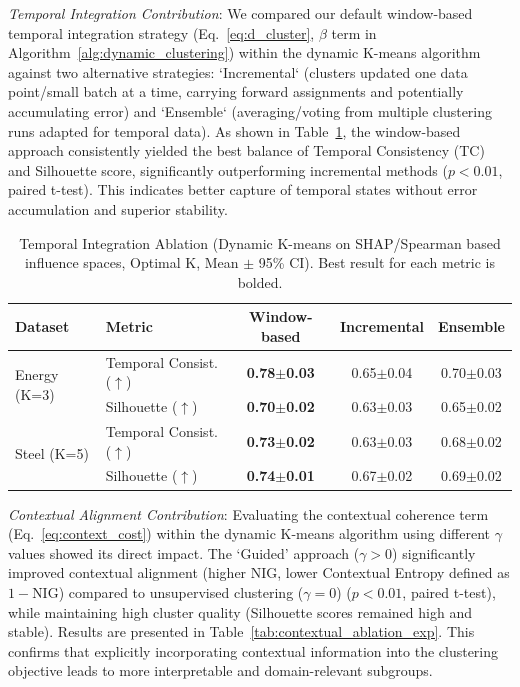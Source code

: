 \documentclass[final,authoryear,3p,times,review,sort&compress]{elsarticle}
\begin{document}
\textit{Temporal Integration Contribution}: We compared our default window-based temporal integration strategy (Eq.~\ref{eq:d_cluster}, $\beta$ term in Algorithm~\ref{alg:dynamic_clustering}) within the dynamic K-means algorithm against two alternative strategies: `Incremental` (clusters updated one data point/small batch at a time, carrying forward assignments and potentially accumulating error) and `Ensemble` (averaging/voting from multiple clustering runs adapted for temporal data). As shown in Table~\ref{tab:temporal_ablation_exp}, the window-based approach consistently yielded the best balance of Temporal Consistency (TC) and Silhouette score, significantly outperforming incremental methods ($p < 0.01$, paired t-test). This indicates better capture of temporal states without error accumulation and superior stability.

\begin{table}[t!]
\centering
\caption{Temporal Integration Ablation (Dynamic K-means on SHAP/Spearman based influence spaces, Optimal K, Mean $\pm$ 95\% CI). Best result for each metric is bolded.}
\label{tab:temporal_ablation_exp}
\begin{tabular}{@{}llccc@{}}
\toprule
\textbf{Dataset} & \textbf{Metric} & \textbf{Window-based} & \textbf{Incremental} & \textbf{Ensemble} \\ \midrule
\multirow{2}{*}{Energy (K=3)} & Temporal Consist. ($\uparrow$) & \textbf{0.78$\pm$0.03} & 0.65$\pm$0.04 & 0.70$\pm$0.03 \\
 & Silhouette ($\uparrow$) & \textbf{0.70$\pm$0.02} & 0.63$\pm$0.03 & 0.65$\pm$0.02 \\ \midrule
\multirow{2}{*}{Steel (K=5)} & Temporal Consist. ($\uparrow$) & \textbf{0.73$\pm$0.02} & 0.63$\pm$0.03 & 0.68$\pm$0.02 \\
 & Silhouette ($\uparrow$) & \textbf{0.74$\pm$0.01} & 0.67$\pm$0.02 & 0.69$\pm$0.02 \\ \bottomrule
\end{tabular}
\end{table}

\textit{Contextual Alignment Contribution}: Evaluating the contextual coherence term (Eq.~\ref{eq:context_cost}) within the dynamic K-means algorithm using different $\gamma$ values showed its direct impact. The `Guided' approach ($\gamma > 0$) significantly improved contextual alignment (higher NIG, lower Contextual Entropy defined as $1 - \text{NIG}$) compared to unsupervised clustering ($\gamma=0$) ($p < 0.01$, paired t-test), while maintaining high cluster quality (Silhouette scores remained high and stable). Results are presented in Table~\ref{tab:contextual_ablation_exp}. This confirms that explicitly incorporating contextual information into the clustering objective leads to more interpretable and domain-relevant subgroups.
\end{document}
